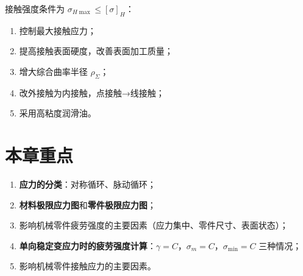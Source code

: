 接触强度条件为 $\sigma_{H\max}\le[\sigma]_H$：
\begin{enumerate}
	\item 控制最大接触应力；
	\item 提高接触表面硬度，改善表面加工质量；
	\item 增大综合曲率半径 $\rho_\Sigma$；
	\item 改外接触为内接触，点接触→线接触；
	\item 采用高粘度润滑油。
\end{enumerate}

\section*{本章重点}

\begin{enumerate}
	\item \textbf{应力的分类}：对称循环、脉动循环；
	\item \textbf{材料极限应力图}和\textbf{零件极限应力图}；
	\item 影响机械零件疲劳强度的主要因素（应力集中、零件尺寸、表面状态）；
	\item \textbf{单向稳定变应力时的疲劳强度计算}：$\gamma=C$，$\sigma_m=C$，$\sigma_{\min}=C$ 三种情况；
	\item 影响机械零件接触应力的主要因素。
\end{enumerate}
